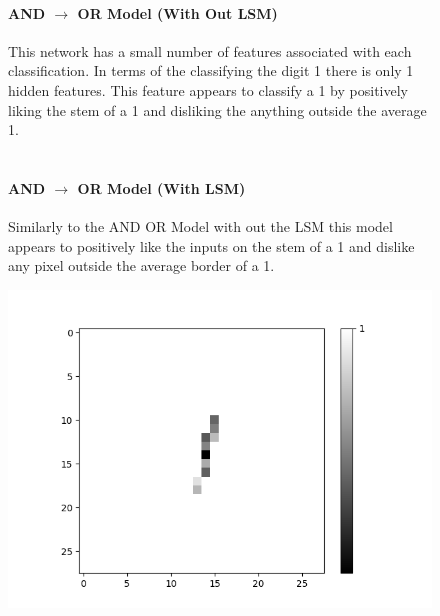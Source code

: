\begin{figure}[H]
	\begin{minipage}[t]{0.48\textwidth}
		\vspace{0px}
		\paragraph{AND $\rightarrow$ OR Model (With Out LSM)}
This network has a small number of features associated with each classification. In terms of the classifying the digit 1 there is only 1 hidden features. This feature appears to classify a 1 by positively liking the stem of a 1 and disliking the anything outside the average 1.\\ \\

		\paragraph{AND $\rightarrow$ OR Model (With LSM)}
Similarly to the AND OR Model with out the LSM this model appears to positively like the inputs on the stem of a 1 and dislike any pixel outside the average border of a 1.
	\end{minipage}
	\hspace{2px}
	\begin{minipage}[t]{0.44\textwidth}
	\vspace{0px}
	\centering
	\begin{minipage}[b]{0.5\textwidth}
		\captionsetup{labelformat=empty}
		\includegraphics[width=\textwidth]{AND-OR(WO-LSM)(1)/Like/True/Layer0-Neuron-3.png}
		\label{}
	\end{minipage}
	

\end{minipage}
\end{figure}
